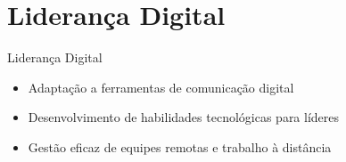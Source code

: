 \documentclass[aspectratio=169,xcolor=dvipsnames]{beamer}
\begin{document}
\section{Liderança Digital}

\begin{frame}{Liderança Digital}
	\begin{itemize}
		\item Adaptação a ferramentas de comunicação digital
		\item Desenvolvimento de habilidades tecnológicas para líderes
		\item Gestão eficaz de equipes remotas e trabalho à distância

	\end{itemize}
\end{frame}
\end{document}
